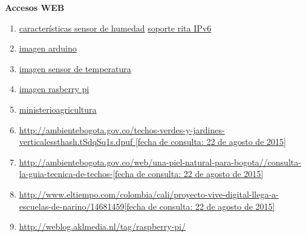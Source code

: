 \documentclass[10pt]{article}\usepackage[]{graphicx}\usepackage[]{color}
\begin{document}
	\textbf{{\Large Accesos WEB}}
	\begin{enumerate}
		\item  \href{http://silicio.mx/sensor-de-humedad-grove}{características sensor de humedad}
		\href{http://rita.udistrital.edu.co/index.php/servicios/servicios-internos/direccionamiento-ipv6-y-dns}{soporte rita IPv6}
		\item \href{	http://articulo.mercadolibre.com.mx/MLM-550669563-arduino-ethernet-shield-generico-atmel-robotica-_JMredirectedFromParent}{imagen arduino}
		\item \href{http://www.reflexiona.biz/shop/temperatura/559--sensor-de-temperatura-lm335a.html}{imagen sensor de temperatura}
		\item \href{http://www.atomsindustries.com/ASD1055}{imagen rasberry pi}
		
		\item \href{https://www.minagricultura.gov.co/}{ministerioagricultura}
		
		\item \href{http://ambientebogota.gov.co/techos-verdes-y-jardines-verticalessthash.tSdqSq1s.dpuf
			}{http://ambientebogota.gov.co/techos-verdes-y-jardines-verticalessthash.tSdqSq1s.dpuf [fecha de consulta: 22 de agosto de 2015]
			}
		
		\item \href{http://ambientebogota.gov.co/web/una-piel-natural-para-bogota//consulta-la-guia-tecnica-de-techos-}{http://ambientebogota.gov.co/web/una-piel-natural-para-bogota//consulta-la-guia-tecnica-de-techos-[fecha de consulta: 22 de agosto de 2015]}
		
		\item \href{http://www.eltiempo.com/colombia/cali/proyecto-vive-digital-llega-a-escuelas-de-narino/14681459}{http://www.eltiempo.com/colombia/cali/proyecto-vive-digital-llega-a-escuelas-de-narino/14681459[fecha de consulta: 22 de agosto de 2015]}
		
			\item \href{http://weblog.aklmedia.nl/tag/raspberry-pi/}{http://weblog.aklmedia.nl/tag/raspberry-pi/}
			

		
		
		
	\end{enumerate}
	
	
	
	
	
\end{document}
